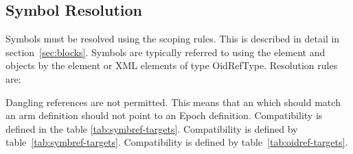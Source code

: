 \subsection{Symbol Resolution}
\label{sec:ref-symbol-resolution}

Symbols must be resolved using the scoping rules. This is described in
detail in section~\ref{sec:blocks}. Symbols are typically referred to
using the  element and objects by the  element
or XML elements of type OidRefType. Resolution rules are:

\begin{valrules}
Dangling references are not permitted.
 This means that an 
which should match an arm definition should not point to an Epoch
definition. Compatibility is defined in the table \ref{tab:symbref-targets}.
 Compatibility is
defined by table~\ref{tab:symbref-targets}.  
 Compatibility is
defined by table~\ref{tab:oidref-targets}.  
\end{valrules}


